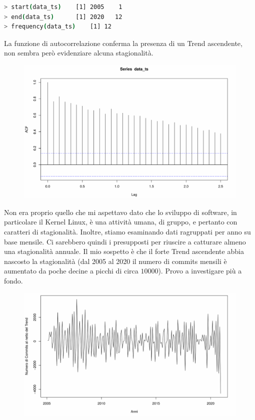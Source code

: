 \documentclass[11pt,a4paper]{article}
\begin{document}
\begin{lstlisting}[language=bash,basicstyle=\scriptsize,tabsize=2,frame = single]
> start(data_ts)	[1] 2005    1
> end(data_ts)		[1] 2020   12
> frequency(data_ts)	[1] 12
\end{lstlisting}
La funzione di autocorrelazione conferma la presenza di un Trend ascendente, non
sembra per\`o evidenziare alcuna stagionalit\`a.
\clearpage
\begin{figure}[H]
	\vspace{-1.5cm}
	\hspace{-0.5cm}
	\includegraphics[scale=0.63]{imgs/acf.pdf}
\end{figure}
\noindent
Non era proprio quello che mi aspettavo dato che lo sviluppo di software, in
particolare il Kernel Linux, \`e una attivit\`a umana, di gruppo, e pertanto con
caratteri di stagionalit\`a. Inoltre, stiamo esaminando dati ragruppati per anno
su base mensile. Ci sarebbero quindi i presupposti per riuscire a catturare
almeno una stagionalit\`a annuale. Il mio sospetto \`e che il forte Trend
ascendente abbia nascosto la stagionalit\`a (dal 2005 al 2020 il numero di
commits mensili \`e aumentato da poche decine a picchi di circa $10000$). Provo
a investigare pi\`u a fondo.
\vspace{-0.4cm}
\begin{figure}[H]
	\includegraphics[scale=0.6]{imgs/diff.pdf}
	\vspace{-0.9cm}
\end{figure}
\end{document}
